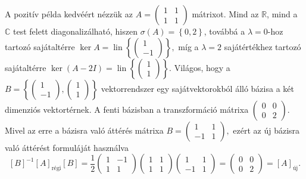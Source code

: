 \documentclass[9pt, a4paper, showtrims]{memoir}
\theoremstyle{plain}
\theoremstyle{remark}
\theoremstyle{definition}
\DeclareMathOperator{\lin}{lin}
\newcommand{\uj}{\text{új}}
\newcommand{\rgi}{\text{régi}}
\begin{document}
A pozitív példa kedvéért nézzük az
\begin{math}
	A
	=
	\begin{pmatrix}
		1 & 1 \\1&1
	\end{pmatrix}
\end{math}
mátrixot.
Mind az $\mathbb{R}$,
mind a $\mathbb{C}$ test felett diagonalizálható,
hiszen $\sigma\left( A \right)=\left\{ 0,2 \right\}$, továbbá
a $\lambda=0$-hoz tartozó sajátaltérre
$\ker A=\lin\left\{
	\begin{pmatrix}
		1 \\-1
	\end{pmatrix}
	\right\},$
míg a $\lambda=2$ sajátértékhez tartozó sajátaltérre
\begin{math}
	\ker\left( A-2I \right)
	=
	\lin\left\{
	\begin{pmatrix}
		1 \\1
	\end{pmatrix}
	\right\}.
\end{math}
Világos, hogy a
\begin{math}
	B
	=
	\left\{
	\begin{pmatrix}
		1 \\-1
	\end{pmatrix},
	\begin{pmatrix}
		1 \\1
	\end{pmatrix}
	\right\}
\end{math}
vektorrendszer egy sajátvektorokból álló bázisa a két dimenziós vektortérnek.
A fenti bázisban a transzformáció mátrixa
\begin{math}
	\begin{pmatrix}
		0 & 0 \\
		0 & 2
	\end{pmatrix}.
\end{math}
Mivel az erre a bázisra való áttérés mátrixa
\begin{math}
	B=
	\begin{pmatrix}
		1  & 1 \\
		-1 & 1
	\end{pmatrix},
\end{math}
ezért az új bázisra való áttérést formuláját használva
\[
	[B]^{-1}[A]_{\rgi}[B]=
	\frac{1}{2}
	\begin{pmatrix}
		1 & -1 \\
		1 & 1
	\end{pmatrix}
	\begin{pmatrix}
		1 & 1 \\1&1
	\end{pmatrix}
	\begin{pmatrix}
		1  & 1 \\
		-1 & 1
	\end{pmatrix}
	=
	\begin{pmatrix}
		0 & 0 \\
		0 & 2
	\end{pmatrix}
	=[A]_{\uj}.
\]
\end{document}
